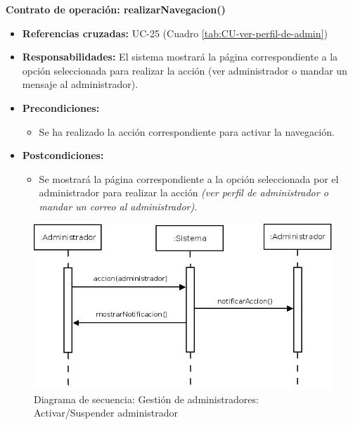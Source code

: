 \textbf{Contrato de operación: realizarNavegacion()}
\begin{itemize}
\item \textbf{Referencias cruzadas:} UC-25 (Cuadro \ref{tab:CU-ver-perfil-de-admin})
\item \textbf{Responsabilidades:} El sistema mostrará la página correspondiente a la opción seleccionada para realizar la acción (ver administrador o mandar un mensaje al administrador).
\item \textbf{Precondiciones:} 
 \begin{itemize}
\item Se ha realizado la acción correspondiente para activar la navegación.
\end {itemize}
\item \textbf{Postcondiciones:} 
 \begin{itemize}
\item Se mostrará la página correspondiente a la opción seleccionada por el administrador para realizar la acción \textit{(ver perfil de administrador o mandar un correo al administrador)}.
\end {itemize}
\end {itemize}

\vspace{7mm}
\dotfill
\vspace{7mm}

\begin{figure}[h!]
\centering
  \includegraphics[scale=.50]{img/secuencias/gestion-administradores-activar-suspender.jpeg}
  \caption{Diagrama de secuencia: Gestión de administradores: Activar/Suspender administrador}
  \label{fig:secuencia-gestion-administradores-activar-suspender}
\end{figure}

